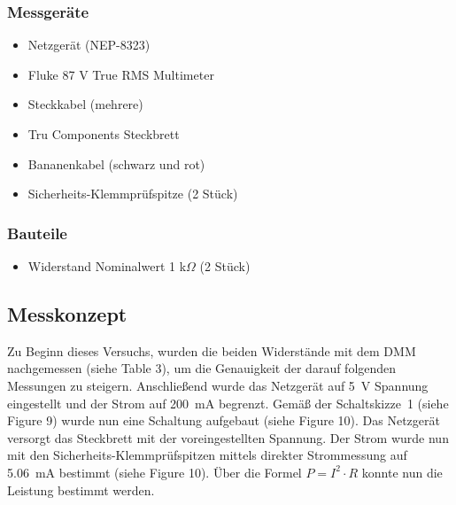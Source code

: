 \documentclass[a4paper,12pt]{article}
\begin{document}
\subsubsection*{Messgeräte}
\begin{itemize}
\item Netzgerät (NEP-8323)
\item Fluke 87 V True RMS Multimeter
\item Steckkabel (mehrere)
\item Tru Components Steckbrett
\item Bananenkabel (schwarz und rot)
\item Sicherheits-Klemmprüfspitze (2 Stück)
\end{itemize}

\subsubsection*{Bauteile}
\begin{itemize}
\item Widerstand Nominalwert 1 k$\Omega$ (2 Stück)
\end{itemize}





\subsection{Messkonzept}
Zu Beginn dieses Versuchs, wurden die beiden Widerstände mit dem DMM nachgemessen (siehe Table 3), um die Genauigkeit der darauf folgenden Messungen zu steigern. Anschließend wurde das Netzgerät auf 5~V Spannung eingestellt und der Strom auf 200~mA begrenzt. Gemäß der Schaltskizze~1 (siehe Figure 9) wurde nun eine Schaltung aufgebaut (siehe Figure 10). Das Netzgerät versorgt das Steckbrett mit der voreingestellten Spannung. Der Strom wurde nun mit den Sicherheits-Klemmprüfspitzen mittels direkter Strommessung auf 5.06~mA bestimmt (siehe Figure 10). Über die Formel \(P = I^2 \cdot R \) konnte nun die Leistung bestimmt werden.
\end{document}
